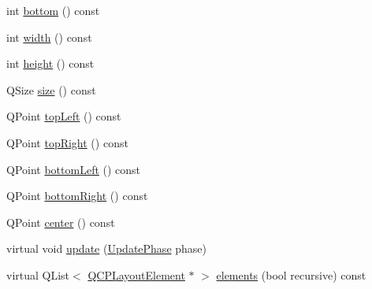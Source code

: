 \begin{DoxyCompactItemize}
\item 
int \mbox{\hyperlink{class_q_c_p_axis_rect_acefdf1abaa8a8ab681e906cc2be9581e}{bottom}} () const
\item 
int \mbox{\hyperlink{class_q_c_p_axis_rect_a204645398a4f9d0b0189385c7c2cfb91}{width}} () const
\item 
int \mbox{\hyperlink{class_q_c_p_axis_rect_acc4377809e79d9a089ab790f39429b0d}{height}} () const
\item 
Q\+Size \mbox{\hyperlink{class_q_c_p_axis_rect_a7a8289346eb612f422c704f8b75cf479}{size}} () const
\item 
Q\+Point \mbox{\hyperlink{class_q_c_p_axis_rect_a5a847b3ddeca3abec38d3838fefb0dbd}{top\+Left}} () const
\item 
Q\+Point \mbox{\hyperlink{class_q_c_p_axis_rect_a7aa221967549ba71b98c465bf8234758}{top\+Right}} () const
\item 
Q\+Point \mbox{\hyperlink{class_q_c_p_axis_rect_ab15d4311d6535ccd7af504dc0e2b98c6}{bottom\+Left}} () const
\item 
Q\+Point \mbox{\hyperlink{class_q_c_p_axis_rect_a36dac884ec8fa3a3a2f3842ca7b7d32d}{bottom\+Right}} () const
\item 
Q\+Point \mbox{\hyperlink{class_q_c_p_axis_rect_ade3aef874bafcec6dd16174fba44c0b1}{center}} () const
\item 
virtual void \mbox{\hyperlink{class_q_c_p_axis_rect_a255080a017df9083a60a321ef2ba9ed8}{update}} (\mbox{\hyperlink{class_q_c_p_layout_element_a0d83360e05735735aaf6d7983c56374d}{Update\+Phase}} phase)
\item 
virtual Q\+List$<$ \mbox{\hyperlink{class_q_c_p_layout_element}{Q\+C\+P\+Layout\+Element}} $\ast$ $>$ \mbox{\hyperlink{class_q_c_p_axis_rect_a40c0b3b17eb317ff4d393b7cb9b082a2}{elements}} (bool recursive) const
\end{DoxyCompactItemize}
